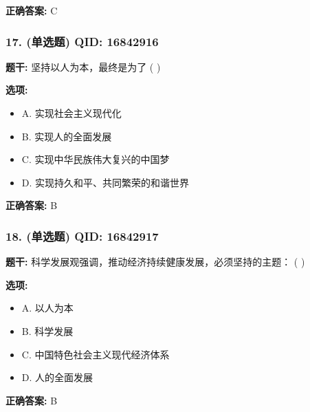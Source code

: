 \documentclass[12pt,UTF8]{ctexart}
\begin{document}
\textbf{正确答案:}
C

\vspace{0.3em}\hrulefill\vspace{0.7em}

\subsubsection*{17. (单选题) \small QID: 16842916}

\textbf{题干:}
坚持以人为本，最终是为了 ( )

\textbf{选项:}
\begin{itemize}[leftmargin=*]

  \item A. 实现社会主义现代化

  \item B. 实现人的全面发展

  \item C. 实现中华民族伟大复兴的中国梦

  \item D. 实现持久和平、共同繁荣的和谐世界

\end{itemize}

\textbf{正确答案:}
B

\vspace{0.3em}\hrulefill\vspace{0.7em}

\subsubsection*{18. (单选题) \small QID: 16842917}

\textbf{题干:}
科学发展观强调，推动经济持续健康发展，必须坚持的主题： ( )

\textbf{选项:}
\begin{itemize}[leftmargin=*]

  \item A. 以人为本

  \item B. 科学发展

  \item C. 中国特色社会主义现代经济体系

  \item D. 人的全面发展

\end{itemize}

\textbf{正确答案:}
B

\vspace{0.3em}\hrulefill\vspace{0.7em}
\end{document}
